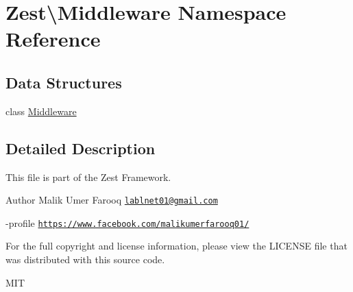 \hypertarget{namespace_zest_1_1_middleware}{}\section{Zest\textbackslash{}Middleware Namespace Reference}
\label{namespace_zest_1_1_middleware}
\subsection*{Data Structures}
\begin{DoxyCompactItemize}
\item 
class \mbox{\hyperlink{class_zest_1_1_middleware_1_1_middleware}{Middleware}}
\end{DoxyCompactItemize}


\subsection{Detailed Description}
This file is part of the Zest Framework.

\begin{DoxyAuthor}{Author}
Malik Umer Farooq \href{mailto:lablnet01@gmail.com}{\tt lablnet01@gmail.\+com} 

-\/profile \href{https://www.facebook.com/malikumerfarooq01/}{\tt https\+://www.\+facebook.\+com/malikumerfarooq01/}
\end{DoxyAuthor}
For the full copyright and license information, please view the L\+I\+C\+E\+N\+SE file that was distributed with this source code.

M\+IT 